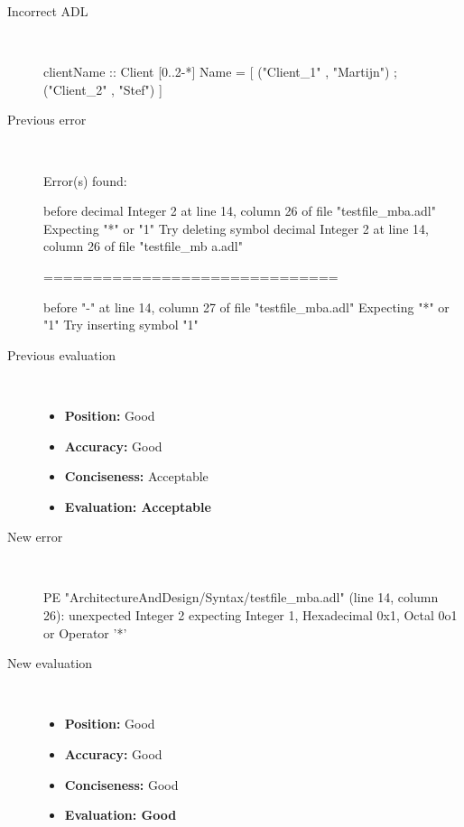 \begin{description}
  \item[Incorrect ADL]~\\
\begin{adl}
clientName :: Client [0..2-*] Name =
    [ ("Client_1"      , "Martijn")
    ; ("Client_2"      , "Stef")
    ]\end{adl}
  \item[Previous error]~\\
\begin{haskell}
Error(s) found:

before decimal Integer 2 at line 14, column 26 of file "testfile_mba.adl"
Expecting "*" or "1"
Try deleting symbol decimal Integer 2 at line 14, column 26 of file "testfile_mb
a.adl"

==============================

before "-" at line 14, column 27 of file "testfile_mba.adl"
Expecting "*" or "1"
Try inserting symbol "1"\end{haskell}
  \item[Previous evaluation]~\\
    \begin{itemize}
    \item \textbf{Position:} Good
    \item \textbf{Accuracy:} Good
    \item \textbf{Conciseness:} Acceptable
    \item \textbf{Evaluation: Acceptable}
    \end{itemize}
  \item[New error]~\\
\begin{haskell}
PE "ArchitectureAndDesign/Syntax/testfile_mba.adl" (line 14, column 26):
unexpected Integer 2
expecting Integer 1, Hexadecimal 0x1, Octal 0o1 or Operator '*'\end{haskell}
  \item[New evaluation]~\\
    \begin{itemize}
    \item \textbf{Position:} Good
    \item \textbf{Accuracy:} Good
    \item \textbf{Conciseness:} Good
    \item \textbf{Evaluation: Good}
    \end{itemize}
  \end{description}

\hrulefill

